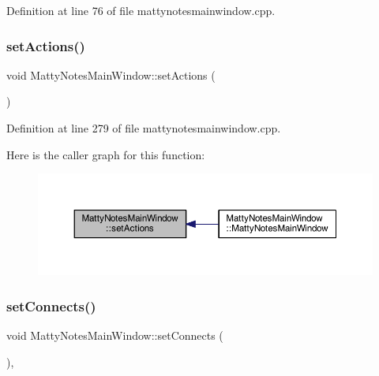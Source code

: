 Definition at line 76 of file mattynotesmainwindow.\+cpp.

\hypertarget{classMattyNotesMainWindow_a1f827486a3eaaf0ce59f8ea4bc70ab87}{}\label{classMattyNotesMainWindow_a1f827486a3eaaf0ce59f8ea4bc70ab87} 
\subsubsection{\texorpdfstring{set\+Actions()}{setActions()}}
{\footnotesize\ttfamily void Matty\+Notes\+Main\+Window\+::set\+Actions (\begin{DoxyParamCaption}{ }\end{DoxyParamCaption})\hspace{0.3cm}{\ttfamily [private]}}



Definition at line 279 of file mattynotesmainwindow.\+cpp.

Here is the caller graph for this function\+:
\nopagebreak
\begin{figure}[H]
\begin{center}
\leavevmode
\includegraphics[width=350pt]{classMattyNotesMainWindow_a1f827486a3eaaf0ce59f8ea4bc70ab87_icgraph}
\end{center}
\end{figure}
\hypertarget{classMattyNotesMainWindow_a1736856c4d60ba43f973d5bd627f0ec0}{}\label{classMattyNotesMainWindow_a1736856c4d60ba43f973d5bd627f0ec0} 
\subsubsection{\texorpdfstring{set\+Connects()}{setConnects()}}
{\footnotesize\ttfamily void Matty\+Notes\+Main\+Window\+::set\+Connects (\begin{DoxyParamCaption}{ }\end{DoxyParamCaption})\hspace{0.3cm}{\ttfamily [inline]}, {\ttfamily [private]}}



